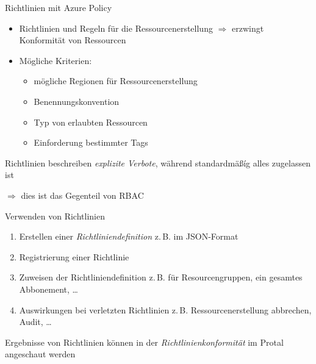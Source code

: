 
\begin{flashcard}[Definition]{Richtlinien mit Azure Policy}
    \begin{itemize}
        \item Richtlinien und Regeln für die Ressourcenerstellung\newline
        $\Rightarrow$ erzwingt Konformität von Ressourcen
        \item Mögliche Kriterien:
        \begin{itemize}
            \item mögliche Regionen für Ressourcenerstellung
            \item Benennungskonvention
            \item Typ von erlaubten Ressourcen
            \item Einforderung bestimmter Tags
        \end{itemize}
    \end{itemize}
    
    \vspace{5mm}
    Richtlinien beschreiben \emph{explizite Verbote}, während standardmäßíg alles zugelassen ist
    
    $\Rightarrow$ dies ist das Gegenteil von RBAC
\end{flashcard}

\begin{flashcard}[\ ]{Verwenden von Richtlinien}
    \begin{enumerate}
        \item Erstellen einer \emph{Richtliniendefinition}\newline
        z.\,B. im JSON-Format
        \item Registrierung einer Richtlinie
        \item Zuweisen der Richtliniendefinition\newline
        z.\,B. für Resourcengruppen, ein gesamtes Abbonement, \ldots
        \item Auswirkungen bei verletzten Richtlinien\newline
        z.\,B. Ressourcenerstellung abbrechen, Audit, \ldots
    \end{enumerate}
    
    \vspace{5mm}
    Ergebnisse von Richtlinien können in der \emph{Richtlinienkonformität} im Protal angeschaut werden
\end{flashcard}


